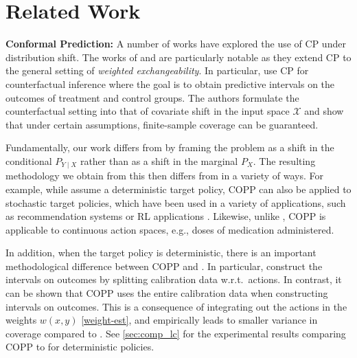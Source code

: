 \section{Related Work}\label{sec:related_work}
\textbf{Conformal Prediction:} A number of works have explored the use of CP under distribution shift. The works of \cite{tibshirani2020conformal} and \cite{lei2020conformal} are particularly notable as they extend CP to the general setting of \textit{weighted exchangeability}.  In particular, \cite{lei2020conformal} use CP for counterfactual inference where the goal is to obtain predictive intervals on the outcomes of treatment and control groups. The authors formulate the counterfactual setting into that of covariate shift in the input space $\mathcal{X}$ and show that under certain assumptions, finite-sample coverage can be guaranteed.

Fundamentally, our work differs from \cite{lei2020conformal} by framing the problem as a shift in the conditional $P_{Y\mid X}$ rather than as a shift in the marginal $P_X$.
The resulting methodology we obtain from this then differs from \cite{lei2020conformal} in a variety of ways.
For example, while \cite{lei2020conformal} assume a deterministic target policy, COPP can also be applied to stochastic target policies, which have been used in a variety of applications, such as recommendation systems or RL applications \citep{swaminathan2016off, su2020doubly, farajtabar2018more}. 
Likewise, unlike \cite{lei2020conformal}, COPP is applicable to continuous action spaces, e.g., doses of medication administered.

In addition, when the target policy is deterministic, there is an important methodological difference between COPP and \cite{lei2020conformal}.
In particular, \cite{lei2020conformal} construct the intervals on outcomes by splitting calibration data w.r.t.\ actions.
In contrast, it can be shown that COPP uses the entire calibration data when constructing intervals on outcomes.
This is a consequence of integrating out the actions in the weights $w(x, y)$ \eqref{weight-est}, and empirically leads to smaller variance in coverage compared to \cite{lei2020conformal}.
See \ref{sec:comp_lc} for the experimental results comparing COPP to \cite{lei2020conformal} for deterministic policies.

